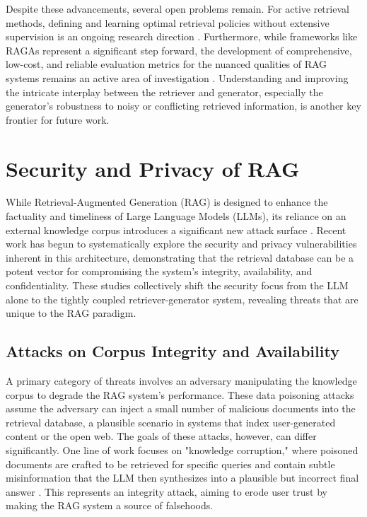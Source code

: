 \documentclass[11pt]{article}
\begin{document}
Despite these advancements, several open problems remain. For active retrieval methods, defining and learning optimal retrieval policies without extensive supervision is an ongoing research direction \cite{ref3}. Furthermore, while frameworks like RAGAs represent a significant step forward, the development of comprehensive, low-cost, and reliable evaluation metrics for the nuanced qualities of RAG systems remains an active area of investigation \cite{ref5}. Understanding and improving the intricate interplay between the retriever and generator, especially the generator's robustness to noisy or conflicting retrieved information, is another key frontier for future work.

\section{Security and Privacy of RAG}
While Retrieval-Augmented Generation (RAG) is designed to enhance the factuality and timeliness of Large Language Models (LLMs), its reliance on an external knowledge corpus introduces a significant new attack surface \cite{ref15}. Recent work has begun to systematically explore the security and privacy vulnerabilities inherent in this architecture, demonstrating that the retrieval database can be a potent vector for compromising the system's integrity, availability, and confidentiality. These studies collectively shift the security focus from the LLM alone to the tightly coupled retriever-generator system, revealing threats that are unique to the RAG paradigm.

\subsection*{Attacks on Corpus Integrity and Availability}

A primary category of threats involves an adversary manipulating the knowledge corpus to degrade the RAG system's performance. These data poisoning attacks assume the adversary can inject a small number of malicious documents into the retrieval database, a plausible scenario in systems that index user-generated content or the open web. The goals of these attacks, however, can differ significantly. One line of work focuses on "knowledge corruption," where poisoned documents are crafted to be retrieved for specific queries and contain subtle misinformation that the LLM then synthesizes into a plausible but incorrect final answer \cite{ref15}. This represents an integrity attack, aiming to erode user trust by making the RAG system a source of falsehoods.
\end{document}
